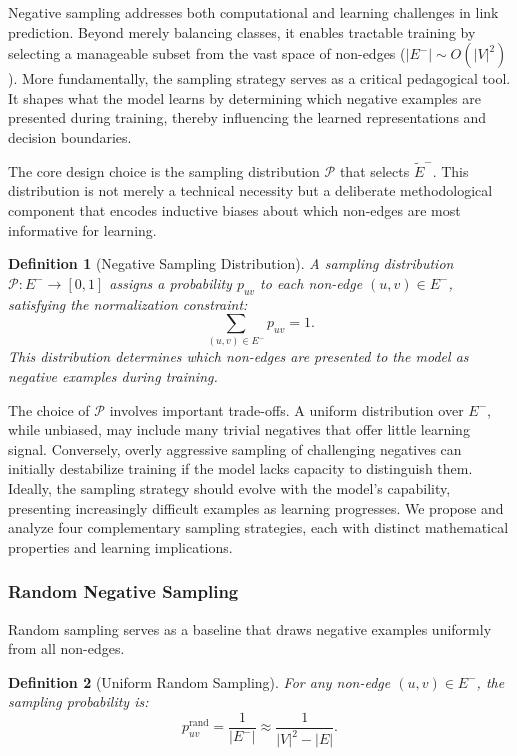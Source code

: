 \documentclass[pdflatex,sn-mathphys-num]{sn-jnl}%
\theoremstyle{thmstyleone}%
\theoremstyle{thmstyletwo}%
\theoremstyle{thmstylethree}%
\newtheorem{definition}{Definition}%
\theoremstyle{plain} %
\theoremstyle{definition} %
\theoremstyle{remark} %
\theoremstyle{plain} %
\begin{document}
Negative sampling addresses both computational and learning challenges in link prediction. 
Beyond merely balancing classes, it enables tractable training by selecting a manageable subset from the vast space of non-edges ($|E^-| \sim O(|V|^2)$). 
More fundamentally, the sampling strategy serves as a critical pedagogical tool.
It shapes what the model learns by determining which negative examples are presented during training, thereby influencing the learned representations and decision boundaries.

The core design choice is the sampling distribution $\mathcal{P}$ that selects $\tilde{E}^-$. 
This distribution is not merely a technical necessity but a deliberate methodological component that encodes inductive biases about which non-edges are most informative for learning.

\begin{definition}[Negative Sampling Distribution]
A sampling distribution $\mathcal{P}: E^- \to [0,1]$ assigns a probability $p_{uv}$ to each non-edge $(u,v) \in E^-$, satisfying the normalization constraint:
\[
\sum_{(u,v) \in E^-} p_{uv} = 1.
\]
This distribution determines which non-edges are presented to the model as negative examples during training.
\end{definition}

The choice of $\mathcal{P}$ involves important trade-offs. 
A uniform distribution over $E^-$, while unbiased, may include many trivial negatives that offer little learning signal. 
Conversely, overly aggressive sampling of challenging negatives can initially destabilize training if the model lacks capacity to distinguish them. 
Ideally, the sampling strategy should evolve with the model's capability, presenting increasingly difficult examples as learning progresses.
We propose and analyze four complementary sampling strategies, each with distinct mathematical properties and learning implications. 


\subsubsection{Random Negative Sampling}

Random sampling serves as a baseline that draws negative examples uniformly from all non-edges.

\begin{definition}[Uniform Random Sampling]
For any non-edge $(u,v) \in E^-$, the sampling probability is:
\begin{equation}
   p_{uv}^{\text{rand}} = \frac{1}{|E^-|} \approx \frac{1}{|V|^2 - |E|}. 
\end{equation}


\end{definition}
\end{document}
